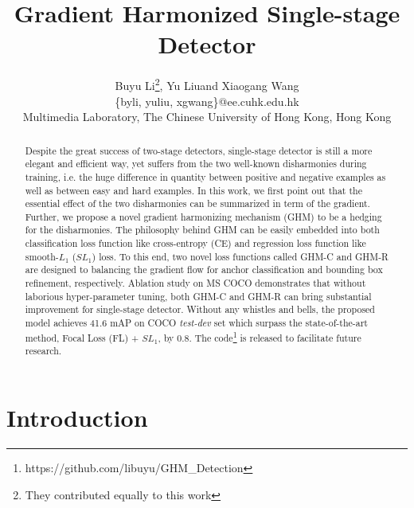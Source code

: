 \documentclass[letterpaper]{article} %
\begin{document}
%
\title{Gradient Harmonized Single-stage Detector}
\author{Buyu Li\thanks{They contributed equally to this work}, Yu Liu\footnotemark[1] and Xiaogang Wang\\
\{byli, yuliu, xgwang\}@ee.cuhk.edu.hk\\
Multimedia Laboratory, The Chinese University of Hong Kong, Hong Kong\\
}
\maketitle
\begin{abstract}
Despite the great success of two-stage detectors, single-stage detector is still a more elegant and efficient way, yet suffers from the two well-known disharmonies during training, i.e. the huge difference in quantity between positive and negative examples as well as between easy and hard examples. In this work, we first point out that the essential effect of the two disharmonies can be summarized in term of the gradient. Further, we propose a novel gradient harmonizing mechanism (GHM) to be a hedging for the disharmonies. The philosophy behind GHM can be easily embedded into both classification loss function like cross-entropy (CE) and regression loss function like smooth-$L_1$ ($SL_1$) loss. To this end, two novel loss functions called GHM-C and GHM-R are designed to balancing the gradient flow for anchor classification and bounding box refinement, respectively. Ablation study on MS COCO demonstrates that without laborious hyper-parameter tuning, both GHM-C and GHM-R can bring substantial improvement for single-stage detector. Without any whistles and bells, the proposed model achieves 41.6 mAP on COCO \textit{test-dev} set which surpass the state-of-the-art method, Focal Loss (FL) + $SL_1$, by 0.8. The code\footnote{https://github.com/libuyu/GHM\_Detection} is released to facilitate future research. 
\end{abstract}

\section{Introduction}
\end{document}
